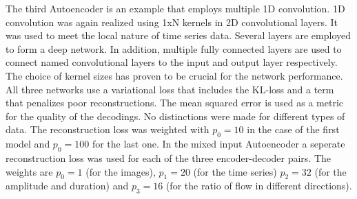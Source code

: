 The third Autoencoder is an example that employs multiple 1D convolution. 1D convolution was again realized using 1xN kernels in 2D convolutional layers. It was used to meet the local nature of time series data. Several layers are employed to form a deep network. In addition, multiple fully connected layers are used to connect named convolutional layers to the input and output layer respectively. The choice of kernel sizes has proven to be crucial for the network performance.\\
All three networks use a variational loss that includes the KL-loss and a term that penalizes poor reconstructions. The mean squared error is used as a metric for the quality of the decodings. No distinctions were made for different types of data. The reconstruction loss was weighted with $p_0=10$ in the case of the first model and $p_0=100$ for the last one. In the mixed input Autoencoder a seperate reconstruction loss was used for each of the three encoder-decoder pairs. The weights are $p_0=1$ (for the images), $p_1=20$ (for the time series) $p_2=32$ (for the amplitude and duration) and $p_3=16$ (for the ratio of flow in different directions).

